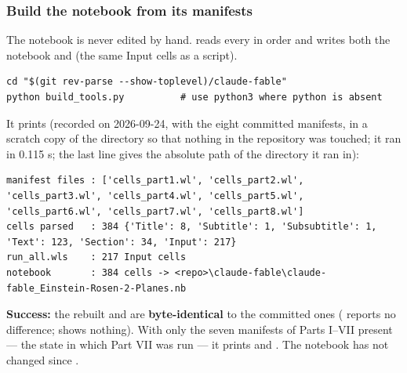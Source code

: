 \subsubsection{Build the notebook from its manifests}
\label{sec:6.3.1}

The notebook is never edited by hand.  reads every  in order and writes both the notebook and  (the same Input cells as a script).

\begin{Verbatim}
cd "$(git rev-parse --show-toplevel)/claude-fable"
python build_tools.py          # use python3 where python is absent
\end{Verbatim}

It prints (recorded on 2026-09-24, with the eight committed manifests, in a scratch copy of the directory so that nothing in the repository was touched; it ran in 0.115 s; the last line gives the absolute path of the directory it ran in):

\begin{Verbatim}
manifest files : ['cells_part1.wl', 'cells_part2.wl', 'cells_part3.wl', 'cells_part4.wl', 'cells_part5.wl', 'cells_part6.wl', 'cells_part7.wl', 'cells_part8.wl']
cells parsed   : 384 {'Title': 8, 'Subtitle': 1, 'Subsubtitle': 1, 'Text': 123, 'Section': 34, 'Input': 217}
run_all.wls    : 217 Input cells
notebook       : 384 cells -> <repo>\claude-fable\claude-fable_Einstein-Rosen-2-Planes.nb
\end{Verbatim}

\textbf{Success:} the rebuilt  and  are \textbf{byte-identical} to the committed ones ( reports no difference;  shows nothing). With only the seven manifests of Parts I--VII present --- the state in which Part VII was run --- it prints  and . The notebook has not changed since .

